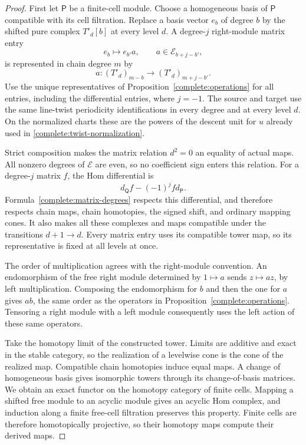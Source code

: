 \begin{proof}
First let $\mathsf P$ be a finite-cell module. Choose a homogeneous
basis of $\mathsf P$ compatible with its cell
filtration. Replace a basis vector $e_b$ of degree $b$ by the shifted
pure complex $T'_d[b]$ at every level $d$. A degree-$j$ right-module
matrix entry
\[
 e_b\longmapsto e_{b'}a,
 \qquad a\in\mathscr E_{b+j-b'},
\]
is represented in chain degree $m$ by
\begin{equation}
\label{complete:matrix-degrees}
 a:(T'_d)_{m-b}\longrightarrow(T'_d)_{m+j-b'}.
\end{equation}
Use the unique representatives of
Proposition~\ref{complete:operations} for all entries, including the
differential entries, where $j=-1$. The source and target use the same
line-twist periodicity identifications in every degree and at every
level $d$. On the normalized charts these are the powers of the descent
unit for $u$ already used in \eqref{complete:twist-normalization}.

Strict composition makes the matrix relation $d^2=0$ an equality of
actual maps. All nonzero degrees of $\mathscr E$ are even, so no
coefficient sign enters this relation. For a degree-$j$ matrix $f$,
the Hom differential is
\[
 d_{\mathsf Q}f-(-1)^j f d_{\mathsf P}.
\]
Formula~\eqref{complete:matrix-degrees} respects this differential,
and therefore respects chain maps, chain homotopies, the signed shift,
and ordinary mapping cones. It also makes all these complexes and maps
compatible under the transitions $d+1\to d$. Every matrix entry uses
its compatible tower map, so its representative is fixed at all levels
at once.

The order of multiplication agrees with the right-module convention.
An endomorphism of the free right module determined by $1\mapsto a$
sends $z\mapsto az$, by left multiplication. Composing the
endomorphism for $b$ and then the one for $a$ gives $ab$, the same
order as the operators in Proposition~\ref{complete:operations}.
Tensoring a right module with a left module consequently uses the
left action of these same operators.

Take the homotopy limit of the constructed tower. Limits are additive
and exact in the stable category, so the realization of a levelwise
cone is the cone of the realized map. Compatible chain homotopies
induce equal maps. A change of homogeneous basis gives isomorphic
towers through its change-of-basis matrices. We obtain an exact functor
on the homotopy category of finite cells. Mapping a shifted free module
to an acyclic module gives an acyclic Hom complex, and induction along
a finite free-cell filtration preserves this property. Finite cells are
therefore homotopically projective, so their homotopy maps compute their
derived maps.


\end{proof}
